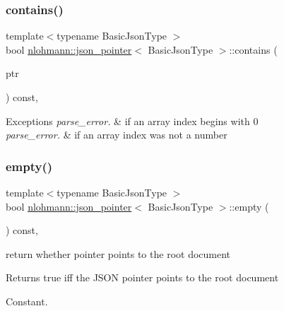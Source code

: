 \subsubsection{\texorpdfstring{contains()}{contains()}}
{\footnotesize\ttfamily template$<$typename Basic\+Json\+Type $>$ \\
bool \hyperlink{classnlohmann_1_1json__pointer}{nlohmann\+::json\+\_\+pointer}$<$ Basic\+Json\+Type $>$\+::contains (\begin{DoxyParamCaption}\item[{const Basic\+Json\+Type $\ast$}]{ptr }\end{DoxyParamCaption}) const\hspace{0.3cm}{\ttfamily [inline]}, {\ttfamily [private]}}


\begin{DoxyExceptions}{Exceptions}
{\em parse\+\_\+error.} & if an array index begins with \textquotesingle{}0\textquotesingle{} \\
\hline
{\em parse\+\_\+error.} & if an array index was not a number \\
\hline
\end{DoxyExceptions}
\mbox{\label{classnlohmann_1_1json__pointer_a649252bda4a2e75a0915b11a25d8bcc3}} 
\subsubsection{\texorpdfstring{empty()}{empty()}}
{\footnotesize\ttfamily template$<$typename Basic\+Json\+Type $>$ \\
bool \hyperlink{classnlohmann_1_1json__pointer}{nlohmann\+::json\+\_\+pointer}$<$ Basic\+Json\+Type $>$\+::empty (\begin{DoxyParamCaption}{ }\end{DoxyParamCaption}) const\hspace{0.3cm}{\ttfamily [inline]}, {\ttfamily [noexcept]}}



return whether pointer points to the root document 

\begin{DoxyReturn}{Returns}
true iff the J\+S\+ON pointer points to the root document
\end{DoxyReturn}
Constant.


